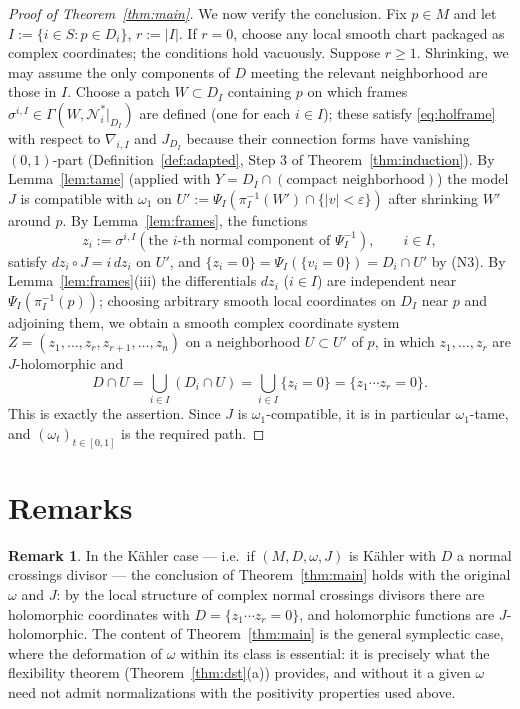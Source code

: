 \documentclass[11pt]{amsart}
\theoremstyle{plain}
\theoremstyle{definition}
\newtheorem{remark}[theorem]{Remark}
\newcommand{\NN}{\mathcal{N}}
\begin{document}
\begin{proof}[Proof of Theorem~\ref{thm:main}]
We now verify the conclusion. Fix $p\in M$ and let
$I:=\{i\in S: p\in D_i\}$, $r:=|I|$. If $r=0$, choose any local smooth chart
packaged as complex coordinates; the conditions hold vacuously. Suppose
$r\ge1$. Shrinking, we may assume the only components of $D$ meeting the
relevant neighborhood are those in $I$. Choose a patch
$W\subset D_I$ containing $p$ on which frames
$\sigma^{i,I}\in\Gamma(W,\NN_i^*|_{D_I})$ are defined (one for each $i\in I$);
these satisfy \eqref{eq:holframe} with respect to $\nabla_{i,I}$ and $J_{D_I}$
because their connection forms have vanishing $(0,1)$-part
(Definition~\ref{def:adapted}, Step 3 of Theorem~\ref{thm:induction}). By
Lemma~\ref{lem:tame} (applied with $Y=D_I\cap(\text{compact neighborhood})$)
the model $J$ is compatible with $\omega_1$ on
$U':=\Psi_I(\pi_I^{-1}(W')\cap\{|v|<\varepsilon\})$ after shrinking $W'$
around $p$. By Lemma~\ref{lem:frames}, the functions
\[
 z_i:=\sigma^{i,I}(\text{the $i$-th normal component of }
 \Psi_I^{-1}),\qquad i\in I,
\]
satisfy $dz_i\circ J=i\,dz_i$ on $U'$, and
$\{z_i=0\}=\Psi_I(\{v_i=0\})=D_i\cap U'$ by (N3). By
Lemma~\ref{lem:frames}(iii) the differentials
$dz_i$ ($i\in I$) are independent near $\Psi_I(\pi_I^{-1}(p))$; choosing
arbitrary smooth local coordinates on $D_I$ near $p$ and adjoining them, we
obtain a smooth complex coordinate system
$Z=(z_1,\dots,z_r,z_{r+1},\dots,z_n)$ on a neighborhood $U\subset U'$ of
$p$, in which $z_1,\dots,z_r$ are $J$-holomorphic and
\[
 D\cap U=\bigcup_{i\in I}(D_i\cap U)=\bigcup_{i\in I}\{z_i=0\}
 =\{z_1\cdots z_r=0\}.
\]
This is exactly the assertion. Since $J$ is $\omega_1$-compatible, it is in
particular $\omega_1$-tame, and $(\omega_t)_{t\in[0,1]}$ is the required
path. \end{proof}

\section{Remarks}

\begin{remark}
In the K\"ahler case — i.e.\ if $(M,D,\omega,J)$ is K\"ahler with $D$ a
normal crossings divisor — the conclusion of Theorem~\ref{thm:main} holds
with the original $\omega$ and $J$: by the local structure of complex normal
crossings divisors there are holomorphic coordinates with
$D=\{z_1\cdots z_r=0\}$, and holomorphic functions are $J$-holomorphic. The
content of Theorem~\ref{thm:main} is the general symplectic case, where the
deformation of $\omega$ within its class is essential: it is precisely what
the flexibility theorem (Theorem~\ref{thm:dst}(a)) provides, and without it a
given $\omega$ need not admit normalizations with the positivity properties
used above.
\end{remark}
\end{document}

